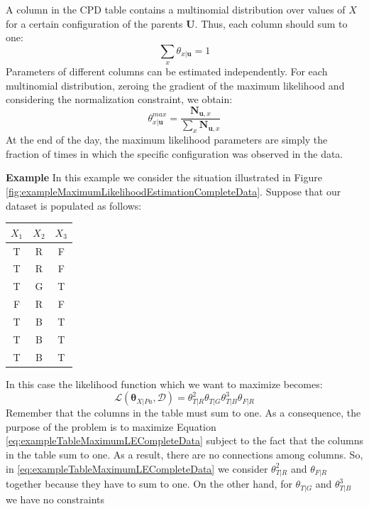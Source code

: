 A column in the CPD table contains a multinomial distribution over values of $X$
for a certain configuration of the parents $\pmb{U}$. Thus, each column should sum
to one:
\[
	\sum_{x} \theta_{x|\pmb{u}}=1
\]
Parameters of different columns can be estimated independently. For each multinomial
distribution, zeroing the gradient of the maximum likelihood and considering the
normalization constraint, we obtain:
\[
	\theta^{\mathit{max}}_{x|\pmb{u}}= \frac{\pmb{N}_{\pmb{u},x}}{\sum_{x} \pmb{N}_{\pmb{u},x}}
\]
At the end of the day, the maximum likelihood parameters are simply the fraction
of times in which the specific configuration was observed in the data.
\newline

\textbf{Example}
\newline
In this example we consider the situation illustrated in Figure
\ref{fig:exampleMaximumLikelihoodEstimationCompleteData}. Suppose that our dataset
is populated as follows:
\begin{center}
	\begin{tabular}{ |c|c|c| }
		$X_{1}$ & $X_{2}$ & $X_{3}$ \\
		\hline
		T       & R       & F       \\
		T       & R       & F       \\
		T       & G       & T       \\
		F       & R       & F       \\
		T       & B       & T       \\
		T       & B       & T       \\
		T       & B       & T       \\
	\end{tabular}
\end{center}
In this case the likelihood function which we want to maximize becomes:
\begin{equation}
	\label{eq:exampleTableMaximumLECompleteData}\mathcal{L}(\pmb{\theta}_{X|\mathit{Pa}}
	, \mathcal{D}) = \theta^{2}_{T|R}\theta_{T|G}\theta^{3}_{T|B}\theta_{F|R}
\end{equation}
Remember that the columns in the table must sum to one. As a consequence, the purpose
of the problem is to maximize Equation \ref{eq:exampleTableMaximumLECompleteData}
subject to the fact that the columns in the table sum to one. As a result, there
are no connections among columns. So, in \ref{eq:exampleTableMaximumLECompleteData}
we consider $\theta^{2}_{T|R}$ and $\theta_{F|R}$ together because they have to sum
to one. On the other hand, for $\theta_{T|G}$ and $\theta^{3}_{T|B}$ we have no constraints
